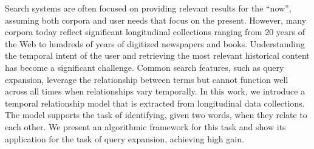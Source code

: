 Search systems are often focused on providing relevant results for the ``now'', assuming both corpora and user needs that focus on the present. However, many corpora today reflect significant longitudinal collections ranging from 20 years of the Web to hundreds of years of digitized newspapers and books. Understanding the temporal intent of the user and retrieving the most relevant historical content has become a significant challenge. Common search features, such as query expansion, leverage the relationship between terms but cannot function well across all times when relationships vary temporally. In this work, we introduce a temporal relationship model that is extracted from longitudinal data collections. The model supports the task of identifying, given two words, when they relate to each other. We present an algorithmic framework for this task and show its application for the task of query expansion, achieving high gain.
